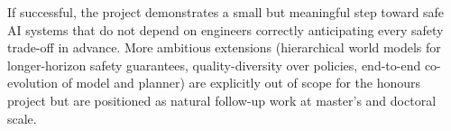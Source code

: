 \documentclass[a4paper,twoside,12pt]{report}
\begin{document}
If successful, the project demonstrates a small but meaningful step toward safe AI systems that do not depend on engineers correctly anticipating every safety trade-off in advance. More ambitious extensions (hierarchical world models for longer-horizon safety guarantees, quality-diversity over policies, end-to-end co-evolution of model and planner) are explicitly out of scope for the honours project but are positioned as natural follow-up work at master's and doctoral scale.



\end{document}
